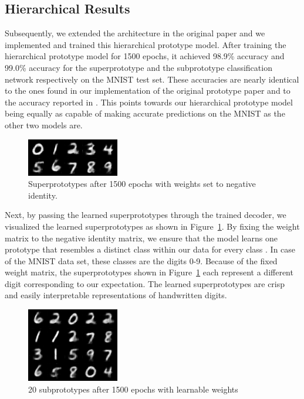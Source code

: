 \subsection{Hierarchical Results}
Subsequently, we extended the architecture in the original paper \cite{li2018deep} and we implemented and trained this hierarchical prototype model. After training the hierarchical prototype model for 1500 epochs, it achieved 98.9\% accuracy and 99.0\% accuracy for the superprototype and the subprototype classification network respectively on the MNIST test set. These accuracies are nearly identical to the ones found in our implementation of the original prototype paper and to the accuracy reported in \cite{li2018deep}. This points towards our hierarchical prototype model being equally as capable of making accurate predictions on the MNIST as the other two models are. 
\begin{figure}[ht]
    \centering
    \includegraphics{img/prot1499.png}
    \caption{Superprototypes after 1500 epochs with weights set to negative identity.}
    \label{superprots}
\end{figure}

Next, by passing the learned superprototypes through the trained decoder, we visualized the learned superprototypes as shown in Figure~\ref{superprots}. By fixing the weight matrix to the negative identity matrix, we ensure that the model learns one prototype that resembles a distinct class within our data for every class \cite{li2018deep}. In case of the MNIST data set, these classes are the digits 0-9. Because of the fixed weight matrix, the superprototypes shown in Figure~\ref{superprots} each represent a different digit corresponding to our expectation. The learned superprototypes are crisp and easily interpretable representations of handwritten digits.

\begin{figure}[ht]
    \centering
    \includegraphics{img/subprot1499.png}
    \caption{20 subprototypes after 1500 epochs with learnable weights}
    \label{subprots}
\end{figure}

